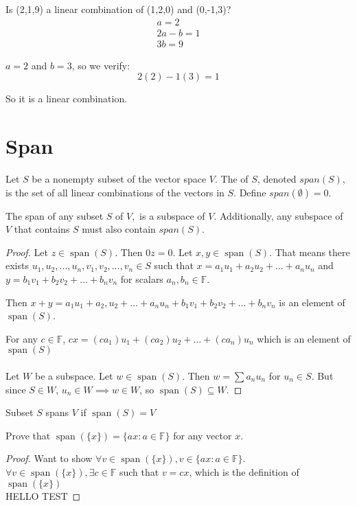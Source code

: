 \documentclass{article}
\begin{document}
\begin{example}[Vectors]
\end{example}

Is (2,1,9) a linear combination of (1,2,0) and (0,-1,3)?
\begin{align*}
    a = 2\\
    2a - b = 1\\
    3b = 9
\end{align*}

$a = 2$ and $b = 3$, so we verify:
\[
2(2) - 1(3) = 1
\]

So it is a linear combination.

\section{Span}
\begin{definition}
    Let $S$ be a nonempty subset of the vector space $V$. The  of $S$, denoted $span(S)$, is the set of all linear combinations of the vectors in $S$. Define $span(\emptyset) = 0$.
\end{definition}

\begin{theorem}
    The span of any subset $S$ of $V,$ is a subspace of $V$. Additionally, any subspace of $V$ that contains $S$ must also contain $span(S)$.
\end{theorem}

\begin{proof}
Let $z \in \operatorname{span}(S)$. Then $0z = 0$. Let $x,y \in \operatorname{span}(S)$. That means there exists $u_1, u_2, \dots, u_n, v_1, v_2, \dots, v_n \in S$ such that $x = a_1u_1 + a_2u_2 + \dots+a_nu_n$ and $y = b_1v_1 + b_2v_2+\dots+b_nv_n$ for scalars $a_n,b_n \in \mathbb{F}$.

Then $x + y = a_1u_1 + a_2,u_2 + \dots+a_nu_n + b_1v_1 + b_2v_2+\dots+b_nv_n$ is an element of $\operatorname{span}(S)$.

For any $c \in \mathbb{F}$, $cx = (ca_1)u_1 + (ca_2)u_2 + \dots+(ca_n)u_n$ which is an element of $\operatorname{span}(S)$
\\
\\
Let $W$ be a subspace. Let $w \in \operatorname{span}(S)$. Then $w = \sum a_nu_n$ for $u_n \in S$. But since $S \in W$, $u_n \in W \implies w \in W$, so $\operatorname{span}(S) \subseteq W$.

\end{proof}

\begin{definition}
    Subset $S$ spans $V$ if $\operatorname{span}(S) = V$
\end{definition}

Prove that $\operatorname{span}(\{x\}) = \{ax: a \in \mathbb{F}\}$ for any vector $x$.

\begin{proof}
    Want to show $\forall v \in \operatorname{span}(\{x\}), v \in \{ax: a \in \mathbb{F}\}$. $\forall v \in \operatorname{span}(\{x\}), \exists c \in \mathbb{F}$ such that $v = cx$, which is the definition of $\operatorname{span}(\{x\})$
    \\
    HELLO TEST

\end{proof}
\end{document}
